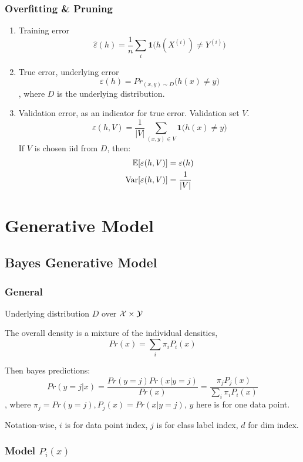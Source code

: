 \documentclass[a4paper]{report}
\begin{document}
\subsection{Overfitting \& Pruning}
\begin{enumerate}
\item Training error 
$$\hat\varepsilon(h) = \frac{1}{n}\sum_i \textbf{1}\Big(h(X^{(i)})\neq Y^{(i)}\Big)$$
\item True error, underlying error 
$$\varepsilon(h)=Pr_{(x,y)\sim D}\Big(h(x)\neq y \Big)$$
, where $D$ is the underlying distribution. 
\item Validation error, as an indicator for true error. Validation set $V$. 
$$\varepsilon(h,V) = \frac{1}{|V|}\sum_{(x, y)\in V} \textbf{1}\Big(h(x)\neq y\Big)$$
If $V$ is chosen iid from $D$, then: 
\begin{align*}
\mathbb{E}[\varepsilon(h, V)] &=\varepsilon(h)\\
\operatorname{Var}[\varepsilon(h, V)] &= \frac{1}{|V|}
\end{align*}
\end{enumerate}


\chapter{Generative Model}
\section{Bayes Generative Model}
\subsection{General}
Underlying distribution $D$ over $\mathcal{X}\times \mathcal{Y}$

The overall density is a mixture of the individual densities,
$$
Pr(x) = \sum_i \pi_i P_i(x)
$$

Then bayes predictions:
$$
Pr(y=j|x) = \frac{Pr(y=j)Pr(x|y=j)}{Pr(x)} = \frac{\pi_jP_j(x)}{\sum_i \pi_i P_i(x)}
$$
, where $\pi_j=Pr(y=j), P_j(x)=Pr(x|y=j)$, $y$ here is for one data point. 

Notation-wise, $i$ is for data point index, $j$ is for class label index, $d$ for dim index.
\subsection{Model $P_i(x)$}
\end{document}
